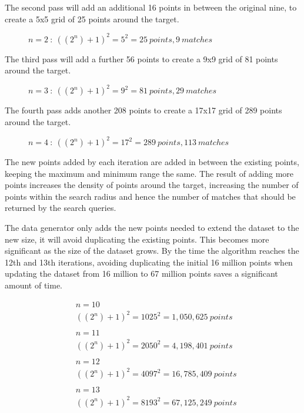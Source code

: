 \documentclass{article}
\newcommand{\dataset} {dataset\xspace}
\begin{document}
The second pass will add an additional 16 points in between the original nine, to create a 5x5 grid of 25 points around the target. 
\begin{figure}[h]

\caption{$n=2 \ :\ ((2^n)+1)^2 = 5^2 = 25 \ points, 9 \ matches$}
\label{fig:data-count-02}
\end{figure}

The third pass will add a further 56 points to create a 9x9 grid of 81 points around the target. 
\begin{figure}[h]

\caption{$n=3 \ :\ ((2^n)+1)^2 = 9^2 = 81 \ points, 29 \ matches$}
\label{fig:data-count-03}
\end{figure}

The fourth pass adds another 208 points to create a 17x17 grid of 289 points around the target.
\begin{figure}[h]

\caption{$n=4 \ :\ ((2^n)+1)^2 = 17^2 = 289 \ points, 113 \ matches$}
\label{fig:data-count-04}
\end{figure}

The new points added by each iteration are added in between the existing points, keeping the maximum and minimum range the same. The result of adding more points increases the density of points around the target, increasing the number of points within the search radius and hence the number of matches that should be returned by the search queries.

The data generator only adds the new points needed to extend the \dataset to the new size, it will avoid duplicating the existing points.
This becomes more significant as the size of the \dataset grows. By the time the algorithm reaches the 12th and 13th iterations, avoiding duplicating the initial 16 million points when updating the \dataset from 16 million to 67 million points saves a significant amount of time.

\begin{equation*}
\begin{split}
& n = 10\\
& ((2^n)+1)^2 = 1025^2 = 1,050,625 \ points
\\
\\
& n = 11\\
& ((2^n)+1)^2 = 2050^2 = 4,198,401 \ points
\\
\\
& n = 12\\
& ((2^n)+1)^2 = 4097^2 = 16,785,409 \ points
\\
\\
& n = 13\\
& ((2^n)+1)^2 = 8193^2 = 67,125,249 \ points
\end{split}
\end{equation*}
\end{document}
